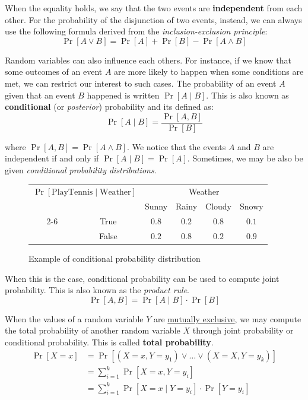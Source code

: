 \documentclass[a4paper, 12pt]{report}
\begin{document}
    When the equality holds, we say that the two events are \textbf{independent} from each other. For the probability of the disjunction of two events, instead, we can always use the following formula derived from the \textit{inclusion-exclusion principle}:
    \[\Pr[A \lor B] = \Pr[A] + \Pr[B] - \Pr[A \land B]\]

    Random variables can also influence each others. For instance, if we know that some outcomes of an event $A$ are more likely to happen when some conditions are met, we can restrict our interest to such cases. The probability of an event $A$ given that an event $B$ happened is written $\Pr[A \mid B]$. This is also known as \textbf{conditional} (or \textit{posterior}) probability and its defined as:
    \[\Pr[A \mid B] = \frac{\Pr[A, B]}{\Pr[B]}\]
    
    where $\Pr[A, B] = \Pr[A \land B]$. We notice that the events $A$ and $B$ are independent if and only if $\Pr[A \mid B] = \Pr[A]$. Sometimes, we may be also be given \textit{conditional probability distributions}.
    \begin{figure}[H]
        \centering
        \begin{tabular}{cc|cccc}
            \multicolumn{2}{c}{$\Pr[\mathrm{PlayTennis} \mid \mathrm{Weather}]$} & \multicolumn{4}{c}{Weather} \\
            & & Sunny & Rainy & Cloudy & Snowy \\
            \cline{2-6}
            \multirow{2}{*}{PlayTennis} & True & $0.8$ & $0.2$ & $0.8$ & $0.1$ \\
            & False &$0.2 $ & $0.8 $ & $0.2 $ & $0.9$
        \end{tabular}
        \caption{Example of conditional probability distribution}
    \end{figure}

    When this is the case, conditional probability can be used to compute joint probability. This is also known as the \textit{product rule}.
    \[\Pr[A , B] = \Pr[A \mid B] \cdot \Pr[B]\]

    When the values of a random variable $Y$ are \underline{mutually exclusive}, we may compute the total probability of another random variable $X$ through joint probability or conditional probability. This is called \textbf{total probability}.
    \[\begin{split}
        \Pr[X = x] & = \Pr[(X = x , Y = y_1) \lor \ldots \lor (X = X , Y = y_k)] \\
        & = \sum_{i = 1}^k \Pr[X = x , Y = y_i] \\
        & = \sum_{i = 1}^k \Pr[X = x \mid Y = y_i] \cdot \Pr[Y = y_i] \\
    \end{split}\]
\end{document}
